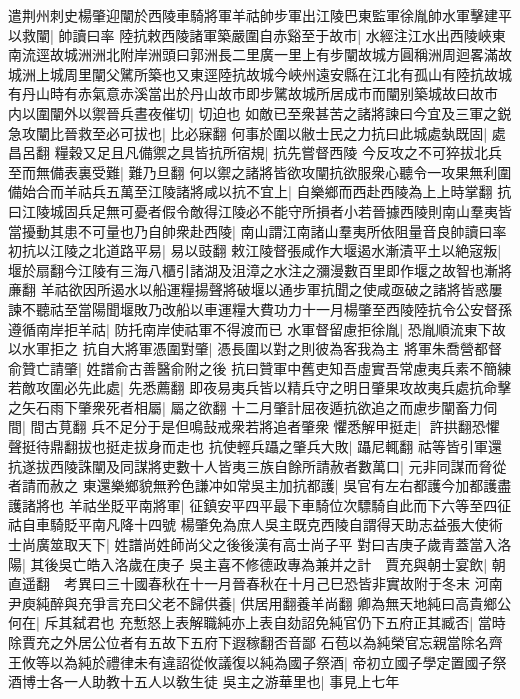 遣荆州刺史楊肇迎闡於西陵車騎將軍羊祜帥步軍出江陵巴東監軍徐胤帥水軍擊建平以救闡|{
	帥讀曰率}
陸抗敕西陵諸軍築嚴圍自赤谿至于故市|{
	水經注江水出西陵峽東南流逕故城洲洲北附岸洲頭曰郭洲長二里廣一里上有步闡故城方圓稱洲周迴畧滿故城洲上城周里闡父騭所築也又東逕陸抗故城今峽州遠安縣在江北有孤山有陸抗故城有丹山時有赤氣意赤溪當出於丹山故市即步騭故城所居成市而闡别築城故曰故市}
内以圍闡外以禦晉兵晝夜催切|{
	切迫也}
如敵已至衆甚苦之諸將諫曰今宜及三軍之鋭急攻闡比晉救至必可拔也|{
	比必寐翻}
何事於圍以敝士民之力抗曰此城處埶既固|{
	處昌呂翻}
糧穀又足且凡備禦之具皆抗所宿規|{
	抗先嘗督西陵}
今反攻之不可猝拔北兵至而無備表裏受難|{
	難乃旦翻}
何以禦之諸將皆欲攻闡抗欲服衆心聽令一攻果無利圍備始合而羊祜兵五萬至江陵諸將咸以抗不宜上|{
	自樂鄉而西赴西陵為上上時掌翻}
抗曰江陵城固兵足無可憂者假令敵得江陵必不能守所損者小若晉據西陵則南山羣夷皆當擾動其患不可量也乃自帥衆赴西陵|{
	南山謂江南諸山羣夷所依阻量音良帥讀曰率}
初抗以江陵之北道路平易|{
	易以豉翻}
敕江陵督張咸作大堰遏水漸漬平土以絶宼叛|{
	堰於扇翻今江陵有三海八櫃引諸湖及沮漳之水注之瀰漫數百里即作堰之故智也漸將亷翻}
羊祜欲因所遏水以船運糧揚聲將破堰以通步軍抗聞之使咸亟破之諸將皆惑屢諫不聽祜至當陽聞堰敗乃改船以車運糧大費功力十一月楊肇至西陵陸抗令公安督孫遵循南岸拒羊祜|{
	防托南岸使祜軍不得渡而已}
水軍督留慮拒徐胤|{
	恐胤順流東下故以水軍拒之}
抗自大將軍憑圍對肇|{
	憑長圍以對之則彼為客我為主}
將軍朱喬營都督俞贊亡請肇|{
	姓譜俞古善醫俞附之後}
抗曰贊軍中舊吏知吾虛實吾常慮夷兵素不簡練若敵攻圍必先此處|{
	先悉薦翻}
即夜易夷兵皆以精兵守之明日肇果攻故夷兵處抗命擊之矢石雨下肇衆死者相屬|{
	屬之欲翻}
十二月肇計屈夜遁抗欲追之而慮步闡畜力伺間|{
	間古莧翻}
兵不足分于是但鳴鼔戒衆若將追者肇衆懼悉解甲挺走|{
	許拱翻恐懼聲挺待鼎翻拔也挺走拔身而走也}
抗使輕兵躡之肇兵大敗|{
	躡尼輒翻}
祜等皆引軍還抗遂拔西陵誅闡及同謀將吏數十人皆夷三族自餘所請赦者數萬口|{
	元非同謀而脅從者請而赦之}
東還樂鄉貌無矜色謙冲如常吳主加抗都護|{
	吳官有左右都護今加都護盡護諸將也}
羊祜坐貶平南將軍|{
	征鎮安平四平最下車騎位次驃騎自此而下六等至四征祜自車騎貶平南凡降十四號}
楊肇免為庶人吳主既克西陵自謂得天助志益張大使術士尚廣筮取天下|{
	姓譜尚姓師尚父之後後漢有高士尚子平}
對曰吉庚子歲青蓋當入洛陽|{
	其後吳亡皓入洛歲在庚子}
吳主喜不修德政專為兼并之計　賈充與朝士宴飲|{
	朝直遥翻　考異曰三十國春秋在十一月晉春秋在十月己巳恐皆非實故附于冬末}
河南尹庾純醉與充爭言充曰父老不歸供養|{
	供居用翻養羊尚翻}
卿為無天地純曰高貴鄉公何在|{
	斥其弑君也}
充慙怒上表解職純亦上表自劾詔免純官仍下五府正其臧否|{
	當時除賈充之外居公位者有五故下五府下遐稼翻否音鄙}
石苞以為純榮官忘親當除名齊王攸等以為純於禮律未有違詔從攸議復以純為國子祭酒|{
	帝初立國子學定置國子祭酒博士各一人助教十五人以敎生徒}
吳主之游華里也|{
	事見上七年}
